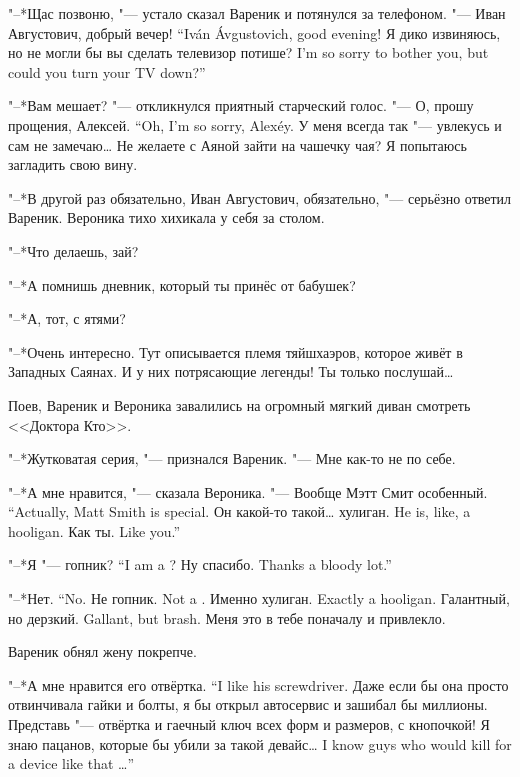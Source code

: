 "--*Щас позвоню, "--- устало сказал Вареник и потянулся за телефоном.
{"--- Иван Августович, добрый вечер!}
{``Iv\'an \'Avgustovich, good evening!}
{Я дико извиняюсь, но не могли бы вы сделать телевизор потише?}
{I'm so sorry to bother you, but could you turn your TV down?''}

"--*Вам мешает? "--- откликнулся приятный старческий голос.
{"--- О, прошу прощения, Алексей.}
{``Oh, I'm so sorry, Alex\'ey.}
У меня всегда так "--- увлекусь и сам не замечаю\ldots{}
Не желаете с Аяной зайти на чашечку чая?
Я попытаюсь загладить свою вину.

"--*В другой раз обязательно, Иван Августович, обязательно, "--- серьёзно ответил Вареник.
Вероника тихо хихикала у себя за столом.

"--*Что делаешь, зай?

"--*А помнишь дневник, который ты принёс от бабушек?

"--*А, тот, с ятями?

"--*Очень интересно.
Тут описывается племя тяйшхаэров, которое живёт в Западных Саянах.
И у них потрясающие легенды!
Ты только послушай\ldots{}

Поев, Вареник и Вероника завалились на огромный мягкий диван смотреть <<Доктора Кто>>.

"--*Жутковатая серия, "--- признался Вареник.
"--- Мне как-то не по себе.

"--*А мне нравится, "--- сказала Вероника.
{"--- Вообще Мэтт Смит особенный.}
{``Actually, Matt Smith is special.}
{Он какой-то такой\ldots{} хулиган.}
{He is, like, a hooligan.}
{Как ты.}
{Like you.''}

{"--*Я "--- гопник?}
{``I am a \gopnik?}
{Ну спасибо.}
{Thanks a bloody lot.''}

{"--*Нет.}
{``No.}
{Не гопник.}
{Not a \gopnik.}
{Именно хулиган.}
{Exactly a hooligan.}
{Галантный, но дерзкий.}
{Gallant, but brash.}
Меня это в тебе поначалу и привлекло.

Вареник обнял жену покрепче.

{"--*А мне нравится его отвёртка.}
{``I like his screwdriver.}
Даже если бы она просто отвинчивала гайки и болты, я бы открыл автосервис и зашибал бы миллионы.
Представь "--- отвёртка и гаечный ключ всех форм и размеров, с кнопочкой!
{Я знаю пацанов, которые бы убили за такой девайс\ldots{}}
{I know guys who would kill for a device like that \ldots{}''}

